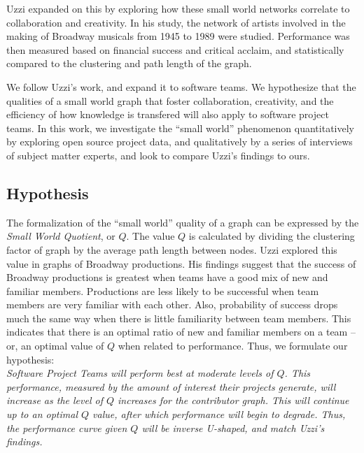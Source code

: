 \documentclass{proc}
\begin{document}
Uzzi \cite{uzzi2005collaboration} expanded on this by exploring how these small world networks correlate to collaboration and creativity. In his study, the network of artists involved in the making of Broadway musicals from 1945 to 1989 were studied. Performance was then measured based on financial success and critical acclaim, and statistically compared to the clustering and path length of the graph.

We follow Uzzi's work, and expand it to software teams. We hypothesize that the qualities of a small world graph that foster collaboration, creativity, and the efficiency of how knowledge is transfered\cite{latora2001efficient} will also apply to software project teams. In this work, we investigate the ``small world'' phenomenon quantitatively by exploring open source project data, and qualitatively by a series of interviews of subject matter experts, and look to compare Uzzi's findings to ours.

\subsection{Hypothesis}
The formalization of the ``small world'' quality of a graph can be expressed by the \textit{Small World Quotient}, or $Q$\cite{watts1999small,watts1998collective}. The value $Q$ is calculated by dividing the clustering factor of graph by the average path length between nodes. Uzzi explored this value in graphs of Broadway productions\cite{uzzi2005collaboration}. His findings suggest that the success of Broadway productions is greatest when teams have a good mix of new and familiar members. Productions are less likely to be successful when team members are very familiar with each other. Also, probability of success drops much the same way when there is little familiarity between team members. This indicates that there is an optimal ratio of new and familiar members on a team -- or, an optimal value of $Q$ when related to performance. Thus, we formulate our hypothesis:\\

\textit{Software Project Teams will perform best at moderate levels of $Q$. This performance, measured by the amount of interest their projects generate, will increase as the level of $Q$ increases for the contributor graph. This will continue up to an optimal $Q$ value, after which performance will begin to degrade. Thus, the performance curve given $Q$ will be inverse U-shaped, and match Uzzi's findings\cite{uzzi2005collaboration}.}
\end{document}
